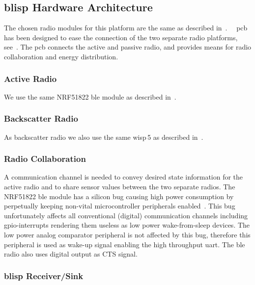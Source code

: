 \documentclass[conference,letterpaper,twoside,final,10pt]{IEEEtran}
\begin{document}
\subsection{\acs{blisp} Hardware Architecture}
\label{sec:blisp_hardware}

The chosen radio modules for this platform are the same as described in~.
{~~}\ac{pcb} has been designed to ease the connection of the two separate radio platforms, see~.
The \ac{pcb} connects the active and passive radio, and provides means for radio collaboration and energy distribution.

\subsubsection{Active Radio}
\label{sec:blisp/ble}

We use the same NRF51822 \ac{ble} module as described in~.

\subsubsection{Backscatter Radio}
\label{sec:blisp/wisp}

As backscatter radio we also use the same \ac{wisp}\,5 as described in~.

\subsubsection{Radio Collaboration}
\label{sec:blisp/collaboration}

A communication channel is needed to convey desired state information for the active radio and to share sensor values between the two separate radios.
The NRF51822 \ac{ble} module has a silicon bug causing high power consumption by perpetually keeping non-vital microcontroller peripherals enabled~\cite[Id 39]{nordic2013pan2}.
This bug unfortunately affects all conventional (digital) communication channels including \ac{gpio}-interrupts rendering them useless as low power wake-from-sleep devices.
The low power analog comparator peripheral is not affected by this bug, therefore this peripheral is used as wake-up signal enabling the high throughput \ac{uart}. 
The \ac{ble} radio also uses digital output as CTS signal.

\subsubsection{\acs{blisp} Receiver/Sink}
\label{sec:blisp/sink}
\end{document}
